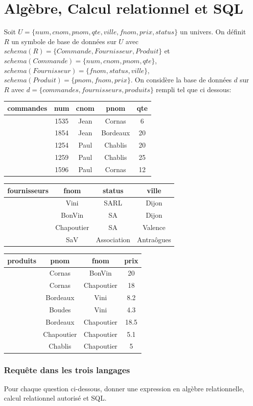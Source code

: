 \documentclass[10pt,a4paper,twoside]{article}
\begin{document}
\newpage
\part{Algèbre, Calcul relationnel et SQL}
Soit $U=\{num, cnom, pnom, qte, ville, fnom, prix, status\}$ un univers. On définit $R$ un symbole de base de données sur $U$ avec $schema(R)=\{Commande, Fournisseur, Produit\}$ et $schema(Commande)=\{num, cnom, pnom, qte\}$, $schema(Fournisseur)=\{fnom, status, ville\}$, $schema(Produit)=\{pnom, fnom, prix\}$. On considère la base de données $d$ sur $R$ avec $d=\{commandes, fournisseurs, produits\}$ rempli tel que ci dessous:

\begin{tabular}{c|cccc}
commandes & num & cnom & pnom & qte \\ 
\hline 
 & 1535 & Jean & Cornas & 6 \\ 
 & 1854 & Jean & Bordeaux & 20 \\ 
 & 1254 & Paul & Chablis & 20 \\ 
 & 1259 & Paul & Chablis & 25 \\ 
 & 1596 & Paul & Cornas & 12 \\ 
\end{tabular} 

\begin{tabular}{c|ccc}
fournisseurs & fnom & status & ville \\ 
\hline 
 & Vini & SARL & Dijon \\ 
 & BonVin & SA & Dijon \\ 
 & Chapoutier & SA & Valence \\ 
 & SaV & Association & Antraôgues \\ 
\end{tabular} 

\begin{tabular}{c|ccc}
produits & pnom & fnom & prix \\ 
\hline 
 & Cornas & BonVin & 20 \\ 
 & Cornas & Chapoutier & 18 \\ 
 & Bordeaux & Vini & 8.2 \\ 
 & Boudes & Vini & 4.3 \\ 
 & Bordeaux & Chapoutier & 18.5 \\ 
 & Chapoutier & Chapoutier & 5.1 \\ 
 & Chablis & Chapoutier & 5 \\ 
\end{tabular} 

\section{Requête dans les trois langages}
Pour chaque question ci-dessous, donner une expression en algèbre relationnelle, calcul relationnel autorisé et SQL.
\end{document}
